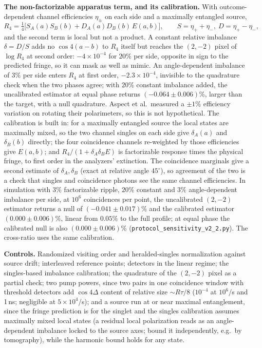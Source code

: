 \documentclass[10pt]{article}
\begin{document}
\textbf{The non-factorizable apparatus term, and its calibration.} With outcome-dependent channel efficiencies $\eta_\pm$ on each side and a maximally entangled source,
\[
R_4 = \tfrac14\big[S_A(a)S_B(b) + D_A(a)D_B(b)\,E(a,b)\big],\qquad S=\eta_++\eta_-,\ D=\eta_+-\eta_-,
\]
and the second term is local but not a product. A constant relative imbalance $\delta=D/S$ adds no $\cos 4(a-b)$ to $R_4$ itself but reaches the $(2,-2)$ pixel of $\log R_4$ at second order: $-4\times 10^{-4}$ for $20\%$ per side, opposite in sign to the predicted fringe, so it can mask as well as mimic. An angle-dependent imbalance of $3\%$ per side enters $R_4$ at first order, $-2.3\times 10^{-4}$, invisible to the quadrature check when the two phases agree; with $20\%$ constant imbalance added, the uncalibrated estimator at equal phase returns $(-0.064\pm0.006)\%$, larger than the target, with a null quadrature. Aspect et al.\ measured a $\pm 1\%$ efficiency variation on rotating their polarimeters, so this is not hypothetical. The calibration is built in: for a maximally entangled source the local states are maximally mixed, so the two channel singles on each side give $\delta_A(a)$ and $\delta_B(b)$ directly; the four coincidence channels re-weighted by those efficiencies give $E(a,b)$; and $R_4/(1+\delta_A\delta_B E)$ is factorizable response times the physical fringe, to first order in the analyzers' extinction. The coincidence marginals give a second estimate of $\delta_A,\delta_B$ (exact at relative angle $45^\circ$), so agreement of the two is a check that singles and coincidence photons see the same channel efficiencies. In simulation with $3\%$ factorizable ripple, $20\%$ constant and $3\%$ angle-dependent imbalance per side, at $10^6$ coincidences per point, the uncalibrated $(2,-2)$ estimator returns a null of $(-0.041\pm 0.017)\%$ and the calibrated estimator $(0.000\pm 0.006)\%$, linear from $0.05\%$ to the full profile; at equal phase the calibrated null is also $(0.000\pm0.006)\%$ (\texttt{protocol\_sensitivity\_v2\_2.py}). The cross-ratio uses the same calibration.

\textbf{Controls.} Randomized visiting order and heralded-singles normalization against source drift; interleaved reference points; detectors in the linear regime; the singles-based imbalance calibration; the quadrature of the $(2,-2)$ pixel as a partial check; two pump powers, since two pairs in one coincidence window with threshold detectors add $\cos 4\Delta$ content of relative size $\sim R\tau/8$ ($10^{-4}$ at $10^6$/s and 1\,ns; negligible at $5\times10^4$/s); and a source run at or near maximal entanglement, since the fringe prediction is for the singlet and the singles calibration assumes maximally mixed local states (a residual local polarization reads as an angle-dependent imbalance locked to the source axes; bound it independently, e.g.\ by tomography), while the harmonic bound holds for any state.
\end{document}
